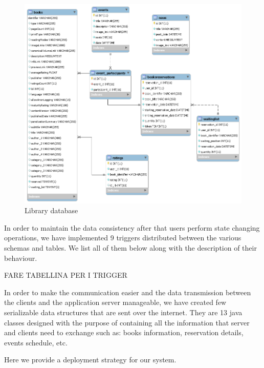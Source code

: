\vspace*{0cm}
\begin{figure}[H]
	\centering
	\includegraphics[scale=0.50]{Images/Diagrams/library_db_UML}
	\caption{Library database}
\end{figure}

In order to maintain the data consistency after that users perform state changing operations, we have implemented 9 triggers distributed between the various schemas and tables. We list all of them below along with the description of their behaviour.

\color{red} FARE TABELLINA PER I TRIGGER
\color{black}

In order to make the communication easier and the data transmission between the clients and the application server manageable, we have created few serializable data structures that are sent over the internet. They are 13 java classes designed with the purpose of containing all the information that server and clients need to exchange such as: books information, reservation details, events schedule, etc. 

Here we provide a deployment strategy for our system.

